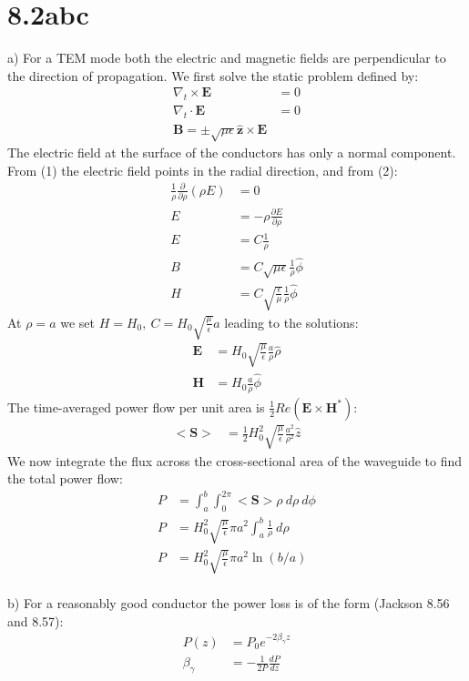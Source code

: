 \documentclass[a4paper,11pt]{article}
\numberwithin{equation}{section}
\newcommand{\bv}[1]{\mathbf{#1}}
\newcommand{\lrp}[1]{\left({#1}\right)}
\begin{document}
\section{8.2abc}
a) For a TEM mode both the electric and magnetic fields are perpendicular to the direction of propagation.
We first solve the static problem defined by:
\begin{align}
 \nabla_t \times \bv{E} &= 0\\
 \nabla_t \cdot \bv{E} &= 0\\
 \bv{B} = \pm \sqrt{\mu\epsilon}\hat{\bv{z}} \times \bv{E}
\end{align}
The electric field at the surface of the conductors has only a normal component.
From (1) the electric field points in the radial direction, and from (2):
\begin{align}
 \frac{1}{\rho}\frac{\partial}{\partial \rho}\lrp{\rho E} &= 0\\
 E &= -\rho\frac{\partial E}{\partial \rho}\\
 E &= C\frac{1}{\rho}\\
 B &= C\sqrt{\mu\epsilon}\frac{1}{\rho}\hat{\phi}\\
 H &= C\sqrt{\frac{\epsilon}{\mu}}\frac{1}{\rho}\hat{\phi}
\end{align}
At $\rho=a$ we set $H=H_0,\ C=H_0\sqrt{\frac{\mu}{\epsilon}}a$ leading to the solutions:
\begin{align}
 \bv{E} &= H_0\sqrt{\frac{\mu}{\epsilon}}\frac{a}{\rho}\hat{\rho}\\
 \bv{H} &= H_0\frac{a}{\rho}\hat{\phi}
\end{align}
The time-averaged power flow per unit area is $\frac{1}{2}Re(\bv{E}\times \bv{H}^*)$:
\begin{align}
 <\bv{S}> &= \frac{1}{2}H_0^2\sqrt{\frac{\mu}{\epsilon}}\frac{a^2}{\rho^2}\hat{z}
\end{align}
We now integrate the flux across the cross-sectional area of the waveguide to find the total power flow:
\begin{align}
 P &= \int_a^b \int_0^{2\pi} <\bv{S}>\rho\ d\rho\  d\phi\\
 P &= H_0^2\sqrt{\frac{\mu}{\epsilon}}\pi a^2 \int_a^b \frac{1}{\rho}\ d\rho\\
 P &= H_0^2\sqrt{\frac{\mu}{\epsilon}}\pi a^2\ln{(b/a)}
\end{align}
\\
b) For a reasonably good conductor the power loss is of the form (Jackson 8.56 and 8.57):
\begin{align}
 P(z) &= P_0e^{-2\beta_\gamma z}\\
 \beta_\gamma &= -\frac{1}{2P}\frac{dP}{dz}
\end{align}
\end{document}
